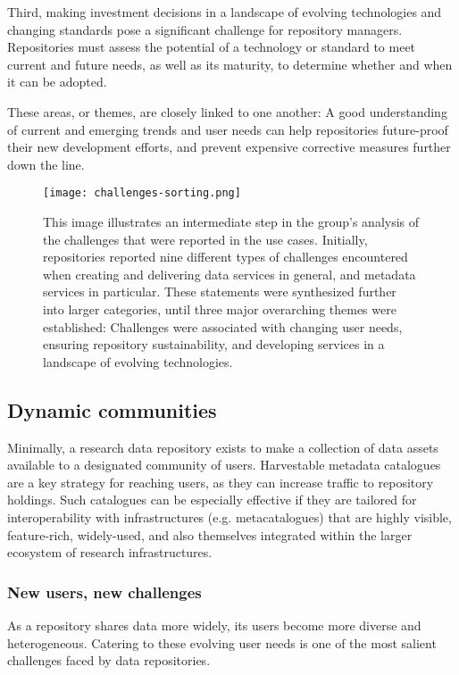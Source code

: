 \documentclass{interact}
\begin{document}
Third, making investment decisions in a landscape of evolving technologies and changing standards pose a significant challenge for repository managers. Repositories must assess the potential of a technology or standard to meet current and future needs, as well as its maturity, to determine whether and when it can be adopted. 

These areas, or themes, are closely linked to one another: A good understanding of current and emerging trends and user needs can help repositories future-proof their new development efforts, and prevent expensive corrective measures further down the line. 

\begin{figure}
\centering
\texttt{[image: challenges-sorting.png]}
\caption{This image illustrates an intermediate step in the group's analysis of the challenges that were reported in the use cases. Initially, repositories reported nine different types of challenges encountered when creating and delivering data services in general, and metadata services in particular. These statements were synthesized further into larger categories, until three major overarching themes were established: Challenges were associated with changing user needs, ensuring repository sustainability, and developing services in a landscape of evolving technologies. } \label{challenges-sorting}
\end{figure}

\subsection{Dynamic communities}
Minimally, a research data repository exists to make a collection of data assets available to a designated community of users. Harvestable metadata catalogues are a key strategy for reaching users, as they can increase traffic to repository holdings. Such catalogues can be especially effective if they are tailored for interoperability with infrastructures (e.g. metacatalogues) that are highly visible, feature-rich, widely-used, and also themselves integrated within the larger ecosystem of research infrastructures. 

\subsubsection{New users, new challenges}
As a repository shares data more widely, its users become more diverse and heterogeneous. Catering to these evolving user needs is one of the most salient challenges faced by data repositories.
\end{document}
